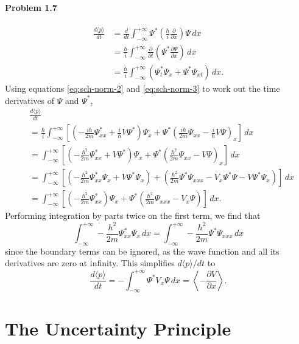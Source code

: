 \documentclass{article}
\begin{document}
\paragraph{Problem 1.7}
\begin{align*}
  \frac{d\langle p \rangle}{dt}
  &= \frac{d}{dt} \int_{-\infty}^{+\infty} \Psi^*\left(
    \frac{\hbar}{i}\frac{\partial}{\partial x}
  \right)\Psi \,dx \\
  &= \frac{\hbar}{i} \int_{-\infty}^{+\infty} \frac{\partial}{\partial t}
  \left(
    \Psi^*\frac{\partial \Psi}{\partial x}
  \right) \,dx \\
  &= \frac{\hbar}{i} \int_{-\infty}^{+\infty} \left(
    \Psi^*_t\Psi_x + \Psi^*\Psi_{xt}
  \right) \,dx.
\end{align*}
Using equations \eqref{eq:sch-norm-2} and \eqref{eq:sch-norm-3} to work out the
time derivatives of $\Psi$ and $\Psi^*$,
\begin{align*}
  &\frac{d\langle p \rangle}{dt} \\
  &= \frac{\hbar}{i} \int_{-\infty}^{+\infty} \left[
    \left(-\frac{i\hbar}{2m}\Psi^*_{xx} + \frac{i}{\hbar}V\Psi^*\right)\Psi_x
    + \Psi^*\left(\frac{i\hbar}{2m}\Psi_{xx} - \frac{i}{\hbar}V\Psi\right)_x
  \right] \,dx \\
  &= \int_{-\infty}^{+\infty} \left[
    \left(-\frac{\hbar^2}{2m}\Psi^*_{xx} + V\Psi^*\right)\Psi_x
    + \Psi^* \left(\frac{\hbar^2}{2m}\Psi_{xx} - V\Psi\right)_x
  \right] \,dx \\
  &= \int_{-\infty}^{+\infty} \left[
    \left(-\frac{\hbar^2}{2m}\Psi^*_{xx}\Psi_x + V\Psi^*\Psi_x\right)
    + \left(
      \frac{\hbar^2}{2m}\Psi^*\Psi_{xxx} - V_x\Psi^*\Psi - V\Psi^*\Psi_x
    \right)
  \right] \,dx \\
  &= \int_{-\infty}^{+\infty} \left[
    \left(-\frac{\hbar^2}{2m}\Psi^*_{xx}\right)\Psi_x
    + \Psi^*\left( \frac{\hbar^2}{2m}\Psi_{xxx} - V_x\Psi\right)
  \right] \,dx.
\end{align*}
Performing integration by parts twice on the first term, we find that \[
  \int_{-\infty}^{+\infty} -\frac{h^2}{2m}\Psi^*_{xx}\Psi_x \,dx
  = \int_{-\infty}^{+\infty} -\frac{h^2}{2m}\Psi^*\Psi_{xxx} \,dx
\]
since the boundary terms can be ignored, as the wave function and all its
derivatives are zero at infinity. This simplifies $d\langle p \rangle/dt$ to \[
  \frac{d\langle p \rangle}{dt}
  = -\int_{-\infty}^{+\infty} \Psi^*V_x\Psi \,dx
  = \left\langle-\frac{\partial V}{\partial x}\right\rangle.
\]

\section{The Uncertainty Principle}
\end{document}
